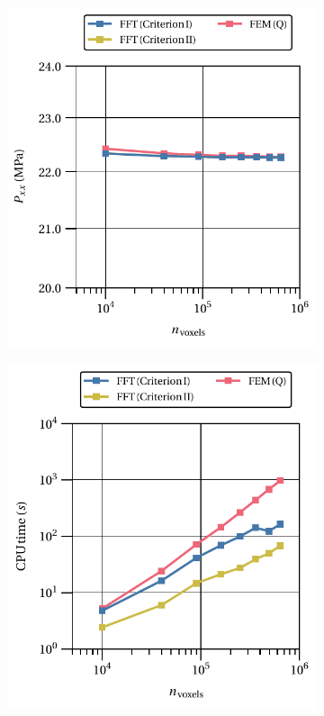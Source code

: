 \begin{figure}[hbt]
  \centering
	\begin{subfigure}[b]{0.49\textwidth}
    \centering
    \includegraphics[width=\textwidth]{figures/svk_2D_normal_homo_stress_11_vs_n_voxels}
    \caption{}
    \label{subfig:svk_2D_normal_homo_stress_11_vs_n_voxels}
  \end{subfigure}
  \begin{subfigure}[b]{0.49\textwidth}
    \centering
    \includegraphics[width=\textwidth]{figures/svk_2D_normal_cpu_time_vs_n_voxels}

\end{subfigure}
\end{figure}
